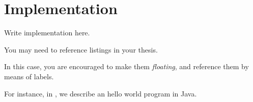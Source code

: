 \chapter{Implementation}
\label{chap:implementation}

Write implementation here.

You may need to reference listings in your thesis.

In this case, you are encouraged to make them \emph{floating}, and reference them by means of labels.

For instance, in , we describe an hello world program in Java.
